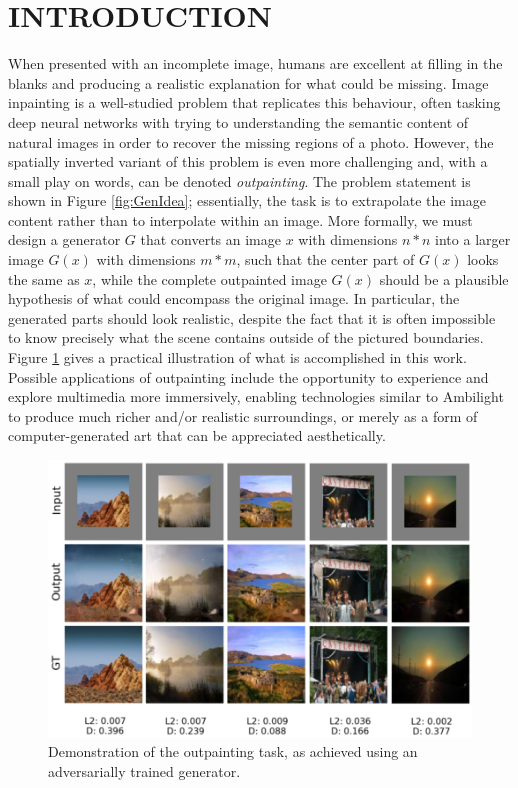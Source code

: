 \documentclass[twocolumn,showpacs,%
  nofootinbib,aps,superscriptaddress,%
  eqsecnum,prd,notitlepage,showkeys,10pt]{revtex4-1}
\begin{document}
\section{INTRODUCTION}

\hspace{\parindent} 


When presented with an incomplete image, humans are excellent at filling in the blanks and producing a realistic explanation for what could be missing. Image inpainting is a well-studied problem that replicates this behaviour, often tasking deep neural networks with trying to understanding the semantic content of natural images in order to recover the missing regions of a photo. However, the spatially inverted variant of this problem is even more challenging and, with a small play on words, can be denoted \textit{outpainting}. The problem statement is shown in Figure \ref{fig:GenIdea}; essentially, the task is to extrapolate the image content rather than to interpolate within an image. More formally, we must design a generator $G$ that converts an image $x$ with dimensions $n*n$ into a larger image $G(x)$ with dimensions $m*m$, such that the center part of $G(x)$ looks the same as $x$, while the complete outpainted image $G(x)$ should be a plausible hypothesis of what could encompass the original image. In particular, the generated parts should look realistic, despite the fact that it is often impossible to know precisely what the scene contains outside of the pictured boundaries. Figure \ref{fig:B3_samples} gives a practical illustration of what is accomplished in this work. Possible applications
of outpainting include the opportunity to experience and explore multimedia more immersively, enabling technologies similar to Ambilight to produce much richer and/or realistic surroundings, or merely as a form of computer-generated art that can be appreciated aesthetically.

\begin{figure}[tp]
\centering
  \begin{adjustbox}{center}
  \includegraphics[width=\columnwidth]{B3_samples}
  \end{adjustbox}
  \caption{Demonstration of the outpainting task, as achieved using an adversarially trained generator.}
  \label{fig:B3_samples}
\end{figure}
\end{document}
